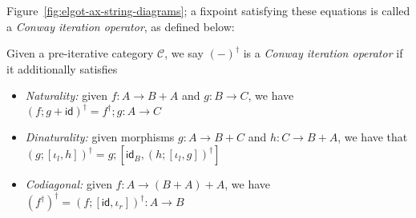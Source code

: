 \documentclass[acmsmall,screen,review]{acmart}
\newcommand{\mc}[1]{\ensuremath{\mathcal{#1}}}
\newcommand{\ms}[1]{\ensuremath{\mathsf{#1}}}
\begin{document}
Figure~\ref{fig:elgot-ax-string-diagrams}; a fixpoint satisfying these equations is called a
\emph{Conway iteration operator}, as defined below:
\begin{definition}
  Given a pre-iterative category $\mc{C}$, we say $(-)^\dagger$ is a \emph{Conway iteration
  operator} if it additionally satisfies
  \begin{itemize}
    \item \emph{Naturality:} given $f : A \to B + A$ and $g : B \to C$, we have
      $
      (f;g + \ms{id})^\dagger = f^\dagger;g : A \to C
      $
    \item \emph{Dinaturality:} given morphisms $g : A \to B + C$ and $h : C \to B + A$, we have that
      $
      (g ; [\iota_l, h])^\dagger = g ; [\ms{id}_B, (h ; [\iota_l, g])^\dagger]
      $
    \item \emph{Codiagonal:} given $f : A \to (B + A) + A$, we have
      $
      (f^\dagger)^\dagger = (f;[\ms{id}, \iota_r])^\dagger : A \to B
      $
  \end{itemize}
\end{definition}
\end{document}
